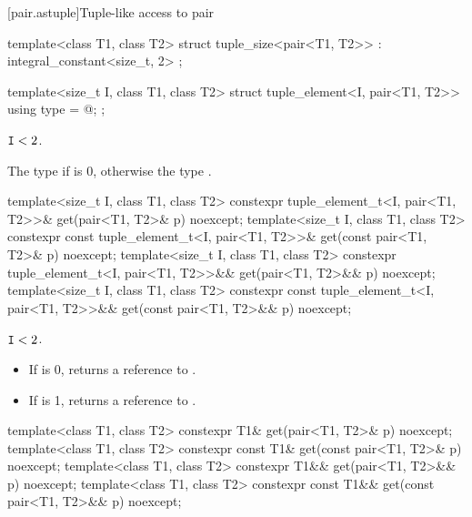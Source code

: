 [pair.astuple]{Tuple-like access to pair}

%
\begin{itemdecl}
template<class T1, class T2>
  struct tuple_size<pair<T1, T2>> : integral_constant<size_t, 2> { };
\end{itemdecl}

%
\begin{itemdecl}
template<size_t I, class T1, class T2>
  struct tuple_element<I, pair<T1, T2>> {
    using type = @\seebelow@ ;
  };
\end{itemdecl}
\begin{itemdescr}
\pnum
\mandates
$\texttt{\protect I} < 2$.

\pnum
\ctype
The type  if  is 0, otherwise the type .
\end{itemdescr}

%
\begin{itemdecl}
template<size_t I, class T1, class T2>
  constexpr tuple_element_t<I, pair<T1, T2>>& get(pair<T1, T2>& p) noexcept;
template<size_t I, class T1, class T2>
  constexpr const tuple_element_t<I, pair<T1, T2>>& get(const pair<T1, T2>& p) noexcept;
template<size_t I, class T1, class T2>
  constexpr tuple_element_t<I, pair<T1, T2>>&& get(pair<T1, T2>&& p) noexcept;
template<size_t I, class T1, class T2>
  constexpr const tuple_element_t<I, pair<T1, T2>>&& get(const pair<T1, T2>&& p) noexcept;
\end{itemdecl}

\begin{itemdescr}
\pnum
\mandates
$\texttt{\protect I} < 2$.

\pnum
\returns
\begin{itemize}
\item If  is 0, returns a reference to .
\item If  is 1, returns a reference to .
\end{itemize}
\end{itemdescr}

%
\begin{itemdecl}
template<class T1, class T2>
  constexpr T1& get(pair<T1, T2>& p) noexcept;
template<class T1, class T2>
  constexpr const T1& get(const pair<T1, T2>& p) noexcept;
template<class T1, class T2>
  constexpr T1&& get(pair<T1, T2>&& p) noexcept;
template<class T1, class T2>
  constexpr const T1&& get(const pair<T1, T2>&& p) noexcept;
\end{itemdecl}

